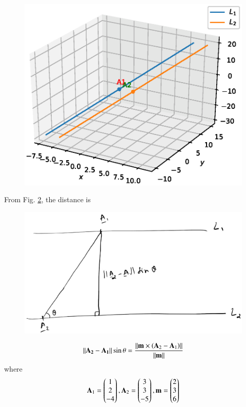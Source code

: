 \begin{enumerate}[label=\arabic*.,ref=\thesubsection.\theenumi]
\begin{figure}[!ht]
\includegraphics[width=\columnwidth]{./line/figs/line_dist_parallel_py.eps}
\caption{}
\label{fig:line_dist_parallel_py}
\end{figure}
%
%
From Fig. \ref{fig:line_dist_parallel}, the distance is
%
\begin{figure}
\centering
\includegraphics[width=\columnwidth]{./line/figs/line_dist_parallel.eps}
\caption{}
\label{fig:line_dist_parallel}
\end{figure}
%
\begin{align}
\label{eq:line_dist_parallel}
\mathbf{\left\lVert\mathbf{A}_2-
\mathbf{A}_1\right\rVert}\sin\theta =\frac{\left\lVert\mathbf{m}\times \left(\mathbf{A}_2-
\mathbf{A}_1\right)\right\rVert}{\left\lVert\mathbf{m}\right\rVert}
\end{align}
%
where 
%
\begin{align}
\mathbf{A}_1 = \begin{pmatrix}1\\2\\-4\end{pmatrix},
\mathbf{A}_2 = \begin{pmatrix}3\\3\\-5\end{pmatrix},
\mathbf{m}=\begin{pmatrix}2 \\ 3 \\6\end{pmatrix}
\end{align}
%


\end{enumerate}
